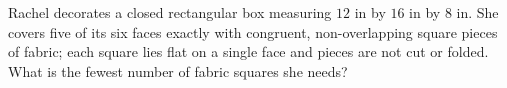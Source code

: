 Rachel decorates a closed rectangular box measuring $12$ in by $16$ in by $8$ in. She covers five of its six faces exactly with congruent, non-overlapping square pieces of fabric; each square lies flat on a single face and pieces are not cut or folded. What is the fewest number of fabric squares she needs?
